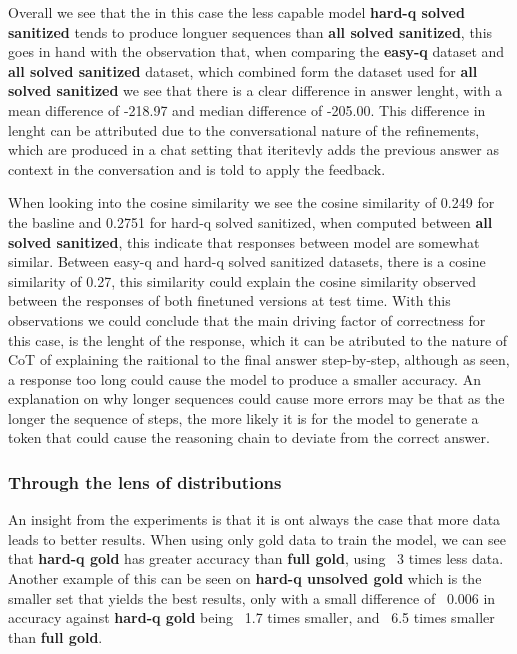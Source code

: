 \documentclass[a4paper,10pt]{article}
\begin{document}
Overall we see that the in this case the less capable model \textbf{hard-q solved sanitized} tends to produce longuer sequences than \textbf{all solved sanitized}, this goes in hand with the observation that, when comparing the \textbf{easy-q} dataset and \textbf{all solved sanitized} dataset, which combined form the dataset used for \textbf{all solved sanitized} we see that there is a clear difference in answer lenght, with a mean difference of -218.97 and median difference of -205.00. This difference in lenght can be attributed due to the conversational nature of the refinements, which are produced in a chat setting that iteritevly adds the previous answer as context in the conversation and is told to apply the feedback. 

When looking into the cosine similarity we see the cosine similarity of 0.249 for the basline and 0.2751 for hard-q solved sanitized, when computed between \textbf{all solved sanitized}, this indicate that responses between model are somewhat similar. Between easy-q and hard-q solved sanitized datasets, there is a cosine similarity of 0.27, this similarity could explain the cosine similarity observed between the responses of both finetuned versions at test time. With this observations we could conclude that the main driving factor of correctness for this case, is the lenght of the response, which it can be atributed to the nature of CoT of explaining the raitional to the final answer step-by-step, although as seen, a response too long could cause the model to produce a smaller accuracy. An explanation on why longer sequences could cause more errors may be that as the longer the sequence of steps, the more likely it is for the model to generate a token that could cause the reasoning chain to deviate from the correct answer.

\subsubsection {Through the lens of distributions}
An insight from the experiments is that it is ont always the case that more data leads to better results. When  using only gold data to train the model, we can see that \textbf{hard-q gold} has greater accuracy than \textbf{full gold}, using ~3 times less data. Another example of this can be seen on \textbf{hard-q unsolved gold} which is the smaller set that yields the best results, only with a small difference of ~0.006 in accuracy against \textbf{hard-q gold} being ~1.7 times smaller, and ~6.5 times smaller than \textbf{full gold}.
\end{document}
